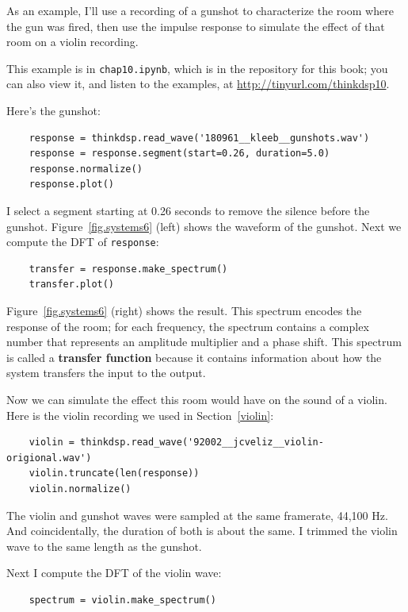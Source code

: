 \documentclass[12pt]{book}
\begin{document}
As an example, I'll use a recording of a gunshot to characterize
the room where the gun was fired, then use the impulse response
to simulate the effect of that room on a violin recording.

This example is in {\tt chap10.ipynb}, which is in the repository
for this book; you can also view it, and listen to the examples,
at \url{http://tinyurl.com/thinkdsp10}.

Here's the gunshot:

\begin{verbatim}
    response = thinkdsp.read_wave('180961__kleeb__gunshots.wav')
    response = response.segment(start=0.26, duration=5.0)
    response.normalize()
    response.plot()
\end{verbatim}

I select a segment starting at 0.26 seconds to remove the silence
before the gunshot.  Figure~\ref{fig.systems6} (left) shows the
waveform of the gunshot.  Next we compute the DFT of {\tt response}:

\begin{verbatim}
    transfer = response.make_spectrum()
    transfer.plot()
\end{verbatim}

Figure~\ref{fig.systems6} (right) shows the result.  This spectrum
encodes the response of the room; for each frequency, the spectrum
contains a complex number that represents an amplitude multiplier and
a phase shift.  This spectrum is called a {\bf transfer
function} because it contains information about how the system transfers
the input to the output.

Now we can simulate the effect this room would have on the sound
of a violin.  Here is the violin recording we used in Section~\ref{violin}:

\begin{verbatim}
    violin = thinkdsp.read_wave('92002__jcveliz__violin-origional.wav')
    violin.truncate(len(response))
    violin.normalize()
\end{verbatim}

The violin and gunshot waves were sampled at the same framerate,
44,100 Hz.  And coincidentally, the duration of both is about the
same.  I trimmed the violin wave to the same length as the gunshot.

Next I compute the DFT of the violin wave:

\begin{verbatim}
    spectrum = violin.make_spectrum()
\end{verbatim}
\end{document}
